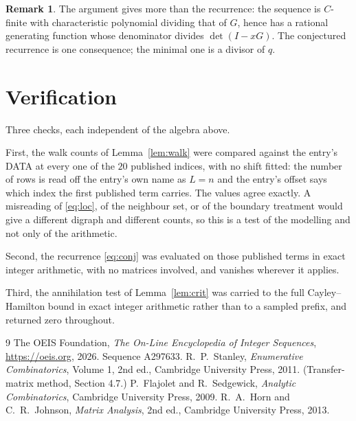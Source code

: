 \documentclass[11pt,a4paper]{article}
\theoremstyle{plain}
\theoremstyle{definition}
\newtheorem{remark}[theorem]{Remark}
\begin{document}
\begin{remark}
The argument gives more than the recurrence: the sequence is $C$-finite with characteristic
polynomial dividing that of $G$, hence has a rational generating function whose denominator
divides $\det(I-xG)$. The conjectured recurrence is one consequence; the minimal one is a
divisor of $q$.
\end{remark}

\section{Verification}

Three checks, each independent of the algebra above.

First, the walk counts of Lemma~\ref{lem:walk} were compared against the entry's DATA at
every one of the $20$ published indices, with no shift fitted: the number of rows is
read off the entry's own name as $L=n$ and the entry's offset says which index the first
published term carries. The values agree exactly. A misreading of \eqref{eq:loc}, of the
neighbour set, or of the boundary treatment would give a different digraph and different
counts, so this is a test of the modelling and not only of the arithmetic.

Second, the recurrence \eqref{eq:conj} was evaluated on those published terms in exact
integer arithmetic, with no matrices involved, and vanishes wherever it applies.

Third, the annihilation test of Lemma~\ref{lem:crit} was carried to the full
Cayley--Hamilton bound in exact integer arithmetic rather than to a sampled prefix, and
returned zero throughout.

\begin{thebibliography}{9}
 The OEIS Foundation, \emph{The On-Line Encyclopedia of Integer
Sequences}, \url{https://oeis.org}, 2026. Sequence A297633.
 R.~P.~Stanley, \emph{Enumerative Combinatorics}, Volume 1, 2nd ed.,
Cambridge University Press, 2011. (Transfer-matrix method, Section 4.7.)
 P.~Flajolet and R.~Sedgewick, \emph{Analytic Combinatorics}, Cambridge
University Press, 2009.
 R.~A.~Horn and C.~R.~Johnson, \emph{Matrix Analysis}, 2nd ed., Cambridge
University Press, 2013.
\end{thebibliography}
\end{document}
